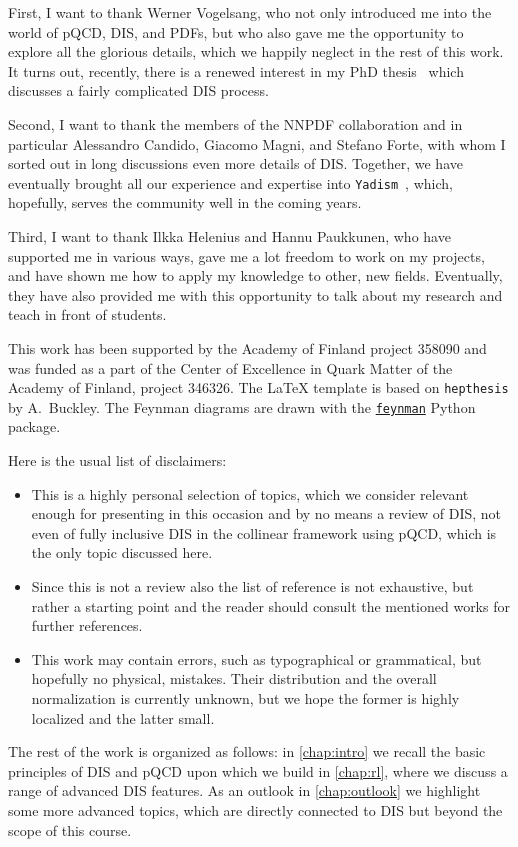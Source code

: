 \begin{acknowledgements}
  First, I want to thank Werner Vogelsang, who not only introduced me into the world of pQCD, DIS, and PDFs, but who also gave me the opportunity to explore all the glorious details, which we happily neglect in the rest of this work.
  It turns out, recently, there is a renewed interest in my PhD thesis~\cite{Hekhorn:2019nlf} which discusses a fairly complicated DIS process.

  Second, I want to thank the members of the NNPDF collaboration and in particular Alessandro Candido, Giacomo Magni, and Stefano Forte, with whom I sorted out in long discussions even more details of DIS.
  Together, we have eventually brought all our experience and expertise into \texttt{Yadism}~\cite{Candido:2024rkr}, which, hopefully, serves the community well in the coming years.

  Third, I want to thank Ilkka Helenius and Hannu Paukkunen, who have supported me in various ways, gave me a lot freedom to work on my projects, and have shown me how to apply my knowledge to other, new fields.
  Eventually, they have also provided me with this opportunity to talk about my research and teach in front of students.

  This work has been supported by the Academy of Finland project 358090 and was funded as a part of the Center of Excellence in Quark Matter of the Academy of Finland, project 346326.
  The \LaTeX{} template is based on \texttt{hepthesis} by A.~Buckley.
  The Feynman diagrams are drawn with the \href{https://pypi.org/project/feynman/}{\texttt{feynman}} Python package.
\end{acknowledgements}


\begin{preface}
  Here is the usual list of disclaimers:
  \begin{itemize}
    \item This is a highly personal selection of topics, which we consider relevant enough for presenting in this occasion and by no means a review of DIS, not even of fully inclusive DIS in the collinear framework using pQCD, which is the only topic discussed here.
    \item Since this is not a review also the list of reference is not exhaustive, but rather a starting point and the reader should consult the mentioned works for further references.
    \item This work may contain errors, such as typographical or grammatical, but hopefully no physical, mistakes. Their distribution and the overall normalization is currently unknown, but we hope the former is highly localized and the latter small.
  \end{itemize}

  The rest of the work is organized as follows: in \cref{chap:intro} we recall the basic principles of DIS and pQCD upon which we build in \cref{chap:rl}, where we discuss a range of advanced DIS features.
  As an outlook in \cref{chap:outlook} we highlight some more advanced topics, which are directly connected to DIS but beyond the scope of this course.
\end{preface}

